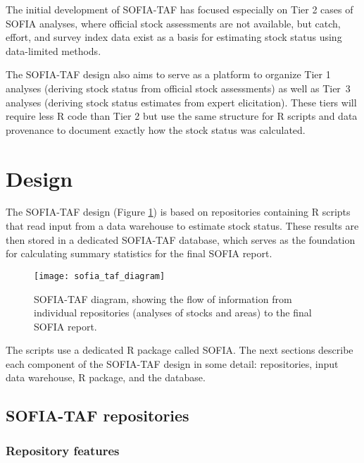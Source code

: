 \documentclass[12pt]{article}
\newcommand\SOFIA{{\sf SOFIA}}
\begin{document}
The initial development of SOFIA-TAF has focused especially on Tier 2 cases of
SOFIA analyses, where official stock assessments are not available, but catch,
effort, and survey index data exist as a basis for estimating stock status using
data-limited methods.

The SOFIA-TAF design also aims to serve as a platform to organize Tier 1
analyses (deriving stock status from official stock assessments) as well as
Tier~3 analyses (deriving stock status estimates from expert elicitation). These
tiers will require less R code than Tier 2 but use the same structure for R
scripts and data provenance to document exactly how the stock status was
calculated.

\newpage


\section{Design}

The SOFIA-TAF design (Figure \ref{fig:sofia-taf-diagram}) is based on
repositories containing R scripts that read input from a data warehouse to
estimate stock status. These results are then stored in a dedicated SOFIA-TAF
database, which serves as the foundation for calculating summary statistics for
the final SOFIA report.

\begin{figure}[htb]
  \begin{center}
    \texttt{[image: sofia\_taf\_diagram]}
    \vspace{2ex}
    \caption{SOFIA-TAF diagram, showing the flow of information from individual
      repositories (analyses of stocks and areas) to the final SOFIA report.}
    \label{fig:sofia-taf-diagram}
  \end{center}
\end{figure}

The scripts use a dedicated R package called \SOFIA. The next sections describe
each component of the SOFIA-TAF design in some detail: repositories, input data
warehouse, R package, and the database.

\subsection{SOFIA-TAF repositories}

\subsubsection{Repository features}
\end{document}

